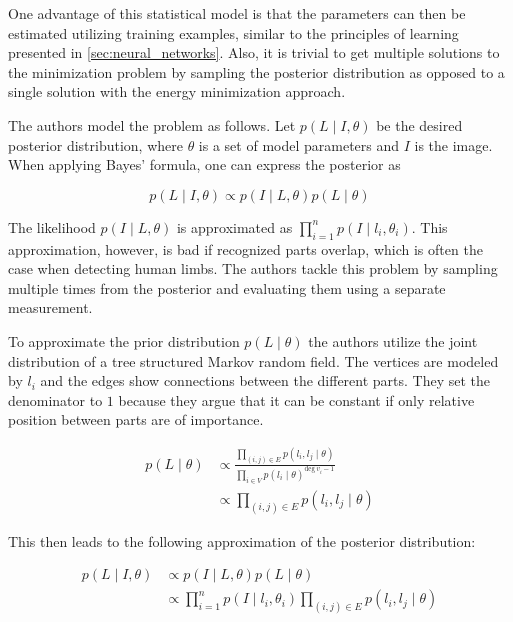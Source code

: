 One advantage of this statistical model is that the parameters can then be estimated utilizing training examples, similar to the principles of learning presented in \ref{sec:neural_networks}.
Also, it is trivial to get multiple solutions to the minimization problem by sampling the posterior distribution as opposed to a single solution with the energy minimization approach.

The authors model the problem as follows.
Let $p(L \mid I, \theta)$ be the desired posterior distribution, where $\theta$ is a set of model parameters and $I$ is the image.
When applying Bayes' formula, one can express the posterior as 

\begin{equation}
    p(L \mid I, \theta) \propto p(I \mid L, \theta) p(L \mid \theta)
\end{equation}

The likelihood $p(I \mid L, \theta)$ is approximated as $\prod_{i=1}^n p(I \mid l_i, \theta_i)$.
This approximation, however, is bad if recognized parts overlap, which is often the case when detecting human limbs.
The authors tackle this problem by sampling multiple times from the posterior and evaluating them using a separate measurement.

To approximate the prior distribution $p(L \mid \theta)$ the authors utilize the joint distribution of a tree structured Markov random field.
The vertices are modeled by $l_i$ and the edges show connections between the different parts. 
They set the denominator to $1$ because they argue that it can be constant if only relative position between parts are of importance.

\begin{equation}
    \begin{split}
        p(L \mid \theta) 
        &\propto \frac{\prod_{(i,j) \in E} p(l_i, l_j \mid \theta)}{\prod_{i \in V} p(l_i \mid \theta)^{\text{deg} ~ v_i -1}} \\
        &\propto \prod_{(i, j) \in E} p(l_i, l_j \mid \theta)
    \end{split}
\end{equation}

This then leads to the following approximation of the posterior distribution:

\begin{equation}
    \label{eq:pictoral-posterior-general}
    \begin{split}
        p(L \mid I, \theta) 
        &\propto p(I \mid L, \theta) p(L \mid \theta) \\
        &\propto \prod_{i=1}^n p(I \mid l_i, \theta_i) \prod_{(i, j) \in E} p(l_i, l_j \mid \theta)
    \end{split} 
\end{equation}

